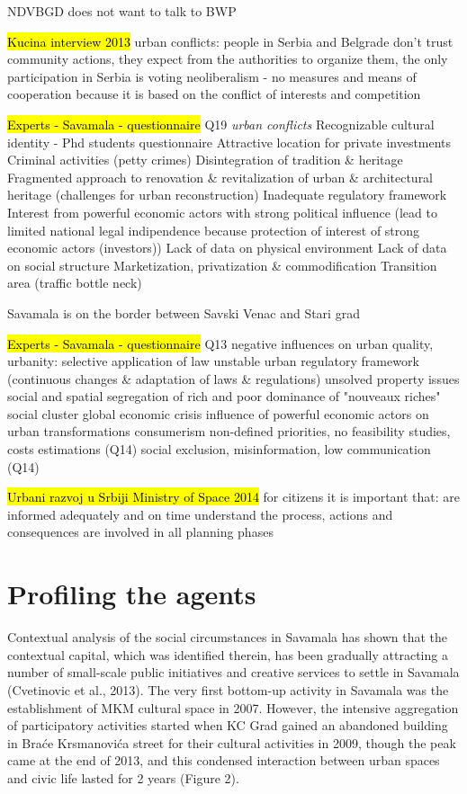 \documentclass[11pt]{report}
\begin{document}
NDVBGD does not want to talk to BWP

\hl{Kucina interview 2013}
urban conflicts: 
people in Serbia and Belgrade don't trust community actions, they expect from the authorities to organize them, the only participation in Serbia is voting
neoliberalism - no measures and means of cooperation because it is based on the conflict of interests and competition

\hl{Experts - Savamala - questionnaire}
Q19
\textit{urban conflicts}
Recognizable cultural identity - Phd students questionnaire
Attractive location for private investments
Criminal activities (petty crimes)
Disintegration of tradition \& heritage
Fragmented approach to renovation \& revitalization of urban \& architectural heritage (challenges for urban reconstruction)
Inadequate regulatory framework
Interest from powerful economic actors with strong political
influence (lead to limited national legal indipendence because protection of interest of strong economic actors (investors))
Lack of data on physical environment
Lack of data on social structure
Marketization, privatization \& commodification
Transition area (traffic bottle neck)

Savamala is on the border between Savski Venac and Stari grad
    
\hl{Experts - Savamala - questionnaire}
Q13
negative influences on  urban quality, urbanity:
selective application of law
unstable urban regulatory framework (continuous changes \& adaptation of laws \& regulations)
unsolved property issues
social and spatial segregation of rich and poor
dominance of "nouveaux riches" social cluster
global economic crisis
influence of powerful economic actors on urban transformations
consumerism
non-defined priorities, no feasibility studies, costs estimations (Q14)
social exclusion, misinformation, low communication (Q14)

\hl{Urbani razvoj u Srbiji Ministry of Space 2014}
for citizens it is important that:
    are informed adequately and on time
    understand the process, actions and consequences
    are involved in all planning phases

\section{Profiling the agents}

Contextual analysis of the social circumstances in Savamala has shown that the contextual capital, which was identified therein, has been gradually attracting a number of small-scale public initiatives and creative services to settle in Savamala (Cvetinovic et al., 2013). The very first bottom-up activity in Savamala was the establishment of MKM cultural space in 2007. However, the intensive aggregation of participatory activities started when KC Grad gained an abandoned building in Braće Krsmanovića street for their cultural activities in 2009, though the peak came at the end of 2013, and this condensed interaction between urban spaces and civic life lasted for 2 years (Figure 2).
\end{document}
